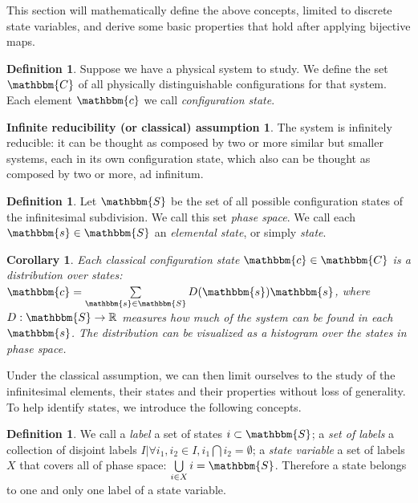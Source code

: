 \documentclass[aps,pra,10pt,twocolumn,floatfix,nofootinbib]{revtex4-1}
\newtheorem{cor}[thm]{Corollary}
\theoremstyle{definition}
\newtheorem{defn}[thm]{Definition}
\newtheorem*{assump1}{Infinite reducibility (or classical) assumption}
\begin{document}
This section will mathematically define the above concepts, limited to discrete state variables, and derive some basic properties that hold after applying bijective maps.

\begin{defn}\label{statedef}
Suppose we have a physical system to study. We define the set $\mathbbm{C}$ of all physically distinguishable configurations for that system. Each element $\mathbbm{c}$ we call \emph{configuration state}.
\end{defn}

\begin{assump1}\label{classical}
The system is infinitely reducible: it can be thought as composed by two or more similar but smaller systems, each in its own configuration state, which also can be thought as composed by two or more, ad infinitum.
\end{assump1}

\begin{defn}\label{classicalPhaseSpace}
Let $\mathbbm{S}$ be the set of all possible configuration states of the infinitesimal subdivision. We call this set \emph{phase space}. We call each $\mathbbm{s} \in \mathbbm{S}$ an \emph{elemental state}, or simply \emph{state}.
\end{defn}

\begin{cor}\label{classicalDistribution}
Each classical configuration state $\mathbbm{c} \in \mathbbm{C}$ is a distribution over states: $\mathbbm{c}=\sum\limits_{\mathbbm{s} \in \mathbbm{S}} D(\mathbbm{s}) \mathbbm{s}$, where $D:\mathbbm{S}\rightarrow\mathbb{R}$ measures how much of the system can be found in each $\mathbbm{s}$. The distribution can be visualized as a histogram over the states in phase space.
\end{cor}

Under the classical assumption, we can then limit ourselves to the study of the infinitesimal elements, their states and their properties without loss of generality. To help identify states, we introduce the following concepts.

\begin{defn}\label{label}
We call a \emph{label} a set of states $i\subset\mathbbm{S}$; a \emph{set of labels} a collection of disjoint labels $I | \forall i_1,i_2\in I, i_1\bigcap i_2 = \emptyset$; a \emph{state variable} a set of labels $X$ that covers all of phase space: $\bigcup\limits_{i \in X}i=\mathbbm{S}$. Therefore a state belongs to one and only one label of a state variable.
\end{defn}
\end{document}
